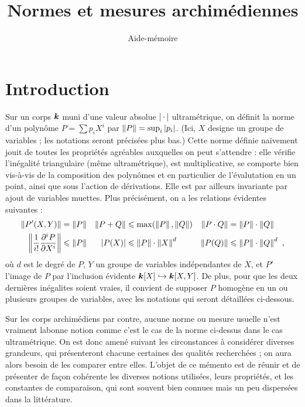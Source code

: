 


\title{Normes et mesures archimédiennes}
\subtitle{Aide-mémoire}



\maketitle

\section*{Introduction}

Sur un corps $\boldsymbol{k}$ muni d'une valeur absolue $\left\lvert{\,\cdot\,}\right\rvert$ ultramétrique, on
définit la norme d'un polynôme $P = \sum p_i X^i$ par $\left\lVert P\right\rVert = \sup_i
\left\lvert p_i\right\rvert$. (Ici, $X$ designe un groupe de variables ; les notations seront
précisées plus bas.) Cette norme définie naïvement jouit de toutes les
propriétés agréables auxquelles on peut s'attendre : elle vérifie l'inégalité
triangulaire (même ultramétrique), est multiplicative, se comporte bien
vis-à-vis de la composition des polynômes et en particulier de l'évalutation
en un point, ainsi que sous l'action de dérivations. Elle est par ailleurs
invariante par ajout de variables muettes. Plus précisément, on a les
relations évidentes suivantes :
\begin{align*}
  \left\lVert P'(X, Y)\right\rVert
  & = \left\lVert P\right\rVert   
  &
  \left\lVert P+Q\right\rVert
  & \leqslant \max (\left\lVert P\right\rVert, \left\lVert Q\right\rVert) 
  &
  \left\lVert P\cdot Q\right\rVert
  & = \left\lVert P\right\rVert \cdot \left\lVert Q\right\rVert
  \\
  \left\lVert \frac{1}{i!} \frac {\partial^i P} {\partial X^i} \right\rVert
  & \leqslant \left\lVert P\right\rVert
  &
  \left\lvert P(X)\right\rvert
  & \leqslant \left\lVert P\right\rVert \cdot \left\lVert X\right\rVert^d   
  &
  \left\lVert P(Q)\right\rVert
  & \leqslant \left\lVert P\right\rVert \cdot \left\lVert Q\right\rVert^d
  \text{ ,}
\end{align*}
où $d$ est le degré de $P$, $Y$ un groupe de variables indépendantes de $X$,
et $P'$ l'image de $P$ par l'inclusion évidente $\boldsymbol{k}[X] \hookrightarrow
\boldsymbol{k}[X, Y]$. De plus, pour que les deux dernières inégalites soient vraies, il
convient de supposer $P$ homogène en un ou plusieurs groupes de variables,
avec les notations qui seront détaillées ci-dessous.

Sur les corps archimédiens par contre, aucune norme ou mesure usuelle n'est
vraiment \og la\fg bonne notion comme c'est le cas de la norme ci-dessus dans
le cas ultramétrique. On est donc amené suivant les circonstances à considérer
diverses grandeurs, qui présenteront chacune certaines des qualités
recherchées ; on aura alors besoin de les comparer entre elles. L'objet de ce
mémento est de réunir et de présenter de façon cohérente les diverses notions
utilisées, leurs propriétés, et les constantes de comparaison, qui sont
souvent bien connues mais un peu dispersées dans la littérature.

